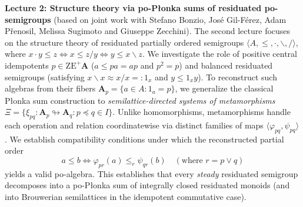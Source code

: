 \documentclass[a4paper]{article} %
\begin{document}
\medskip

\noindent
\textbf{Lecture 2: Structure theory via po-P\l onka sums of residuated po-semigroups} (based on joint work with Stefano Bonzio, Jos\'e Gil-F\'erez, Adam P\v renosil, Melissa Sugimoto and Giuseppe Zecchini).
The second lecture focuses on the structure theory of residuated partially ordered semigroups $\langle A, \leqslant, \cdot, \backslash, /\rangle$, where $x \cdot y \leqslant z \iff x \leqslant z/y \iff y \leqslant x \backslash z$. We investigate the role of positive central idempotents $p \in \mathrm{ZE}^+ \mathbf{A}$ ($a \leqslant pa = ap$ and $p^2 = p$) and balanced residuated semigroups (satisfying $x \backslash x \approx x / x =: 1_x$ and $y \leqslant 1_x y$). To reconstruct such algebras from their fibers $\mathbf{A}_p = \{a \in A : 1_a = p\}$, we generalize the classical P\l onka sum construction to \emph{semilattice-directed systems of metamorphisms} $\Xi = \{\xi_{pq}: \mathbf{A}_p \looparrowright \mathbf{A}_q : p \preccurlyeq q \in I\}$. Unlike homomorphisms, metamorphisms handle each operation and relation coordinatewise via distinct families of maps $\langle \varphi_{pq}, \psi_{pq}\rangle$. We establish compatibility conditions under which the reconstructed partial order
\[
a \leqslant b \iff \varphi_{pr}(a) \leqslant_r \psi_{qr}(b) \quad (\text{where } r = p \vee q)
\]
yields a valid po-algebra. This establishes that every \emph{steady} residuated semigroup decomposes into a po-P\l onka sum of integrally closed residuated monoids (and into Brouwerian semilattices in the idempotent commutative case).

\medskip
\end{document}
